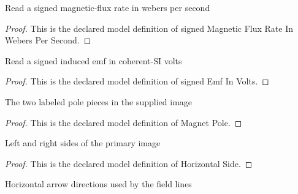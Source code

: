 \begin{definition}
  \label{def:physics:phyx-mini-0936:phyxminiproblems-problemphyxmini0936-signedmagneticfluxrateinweberspersecond}
  Read a signed magnetic-flux rate in webers per second
\end{definition}
\begin{proof}
  This is the declared model definition of signed Magnetic Flux Rate In Webers Per Second.
\end{proof}
\begin{definition}
  \label{def:physics:phyx-mini-0936:phyxminiproblems-problemphyxmini0936-signedemfinvolts}
  Read a signed induced emf in coherent-SI volts
\end{definition}
\begin{proof}
  This is the declared model definition of signed Emf In Volts.
\end{proof}
\begin{definition}
  \label{def:physics:phyx-mini-0936:phyxminiproblems-problemphyxmini0936-magnetpole}
  The two labeled pole pieces in the supplied image
\end{definition}
\begin{proof}
  This is the declared model definition of Magnet Pole.
\end{proof}
\begin{definition}
  \label{def:physics:phyx-mini-0936:phyxminiproblems-problemphyxmini0936-horizontalside}
  Left and right sides of the primary image
\end{definition}
\begin{proof}
  This is the declared model definition of Horizontal Side.
\end{proof}
\begin{definition}
  \label{def:physics:phyx-mini-0936:phyxminiproblems-problemphyxmini0936-horizontaldirection}
  Horizontal arrow directions used by the field lines
\end{definition}
